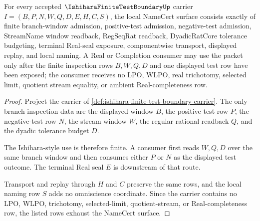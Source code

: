 \begin{theorem}
\label{thm:ishihara-finite-test-boundary-namecert-obligations}
For every accepted $\IshiharaFiniteTestBoundaryUp$ carrier $I=(B,P,N,W,Q,D,E,H,C,S)$, the local NameCert surface consists exactly of finite branch-window admission, positive-test admission, negative-test admission, StreamName window readback, RegSeqRat readback, DyadicRatCore tolerance budgeting, terminal Real-seal exposure, componentwise transport, displayed replay, and local naming. A Real or Completion consumer may use the packet only after the finite inspection rows $B,W,Q,D$ and one displayed test row have been exposed; the consumer receives no LPO, WLPO, real trichotomy, selected limit, quotient stream equality, or ambient Real-completeness row.
\end{theorem}
\begin{proof}
Project the carrier of \autoref{def:ishihara-finite-test-boundary-carrier}. The only branch-inspection data are the displayed window $B$, the positive-test row $P$, the negative-test row $N$, the stream window $W$, the regular rational readback $Q$, and the dyadic tolerance budget $D$.

The Ishihara-style use is therefore finite. A consumer first reads $W,Q,D$ over the same branch window and then consumes either $P$ or $N$ as the displayed test outcome. The terminal Real seal $E$ is downstream of that route.

Transport and replay through $H$ and $C$ preserve the same rows, and the local naming row $S$ adds no omniscience coordinate. Since the carrier contains no LPO, WLPO, trichotomy, selected-limit, quotient-stream, or Real-completeness row, the listed rows exhaust the NameCert surface.
\end{proof}


\begin{closurestatus}{\IshiharaFiniteTestBoundaryUp}
  \theoryclosure{\seedClosure}
  \formalstatus{\unformalizedV}
\end{closurestatus}
